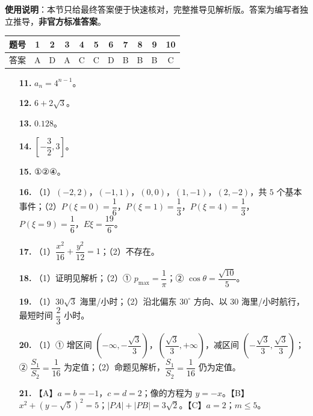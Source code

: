 
\begin{gknotice}
\textbf{使用说明}：本节只给最终答案便于快速核对，完整推导见解析版。答案为编写者独立推导，\textbf{非官方标准答案}。
\end{gknotice}

\begin{center}\begin{tabular}{ccccccccccc}
\toprule
题号 & 1 & 2 & 3 & 4 & 5 & 6 & 7 & 8 & 9 & 10 \\
\midrule
答案 & A & D & A & C & C & D & B & B & B & C \\
\bottomrule
\end{tabular}\end{center}

\begin{itemize}[leftmargin=2.6em]
  \item[\textbf{11.}] $a_n=4^{n-1}$。
  \item[\textbf{12.}] $6+2\sqrt3$。
  \item[\textbf{13.}] $0.128$。
  \item[\textbf{14.}] $\left[-\dfrac32,3\right]$。
  \item[\textbf{15.}] ①②④。
\end{itemize}

\begin{itemize}[leftmargin=2.6em]
  \item[\textbf{16.}] （1）$(-2,2)$，$(-1,1)$，$(0,0)$，$(1,-1)$，$(2,-2)$，共 $5$ 个基本事件；（2）$P(\xi=0)=\dfrac16$，$P(\xi=1)=\dfrac13$，$P(\xi=4)=\dfrac13$，$P(\xi=9)=\dfrac16$，$E\xi=\dfrac{19}{6}$。
  \item[\textbf{17.}] （1）$\dfrac{x^2}{16}+\dfrac{y^2}{12}=1$；（2）不存在。
  \item[\textbf{18.}] （1）证明见解析；（2）① $p_{\max}=\dfrac1\pi$；② $\cos\theta=\dfrac{\sqrt{10}}{5}$。
  \item[\textbf{19.}] （1）$30\sqrt3$ 海里/小时；（2）沿北偏东 $30^\circ$ 方向、以 $30$ 海里/小时航行，最短时间 $\dfrac23$ 小时。
  \item[\textbf{20.}] （1）① 增区间 $\left(-\infty,-\dfrac{\sqrt3}{3}\right)$，$\left(\dfrac{\sqrt3}{3},+\infty\right)$，减区间 $\left(-\dfrac{\sqrt3}{3},\dfrac{\sqrt3}{3}\right)$；② $\dfrac{S_1}{S_2}=\dfrac1{16}$ 为定值；（2）命题见解析，$\dfrac{S_1}{S_2}=\dfrac1{16}$ 仍为定值。
  \item[\textbf{21.}] 【A】$a=b=-1$，$c=d=2$；像的方程为 $y=-x$。【B】$x^2+(y-\sqrt5)^2=5$；$|PA|+|PB|=3\sqrt2$。【C】$a=2$；$m\leqslant5$。
\end{itemize}
